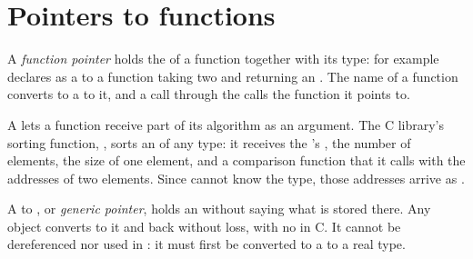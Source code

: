 \section{Pointers to functions}\label{sec:b1:pointers-and-arrays:functions}

\begin{definition}\label{def:b1:pointers-and-arrays:function-pointer}
A \emph{function pointer} holds the  of a function together with its type: for
example  declares  as a  to a function taking two  and returning
an . The name of a function converts to a  to it, and a call  through the 
calls the function it points to.
\end{definition}

\label{lst:b1:pointers-and-arrays:ops}


A  lets a function receive part of its algorithm as an argument. The C library's sorting function,
, sorts an  of any type: it receives the 's , the number of elements, the size of one
element, and a comparison function that it calls with the addresses of two elements. Since  cannot know
the type, those addresses arrive as .

\begin{definition}\label{def:b1:pointers-and-arrays:generic}
A  to , or \emph{generic pointer}, holds an  without saying what is
stored there. Any object  converts to it and back without loss, with no  in C. It cannot be dereferenced
nor used in : it must first be converted to a  to a real type.
\end{definition}

